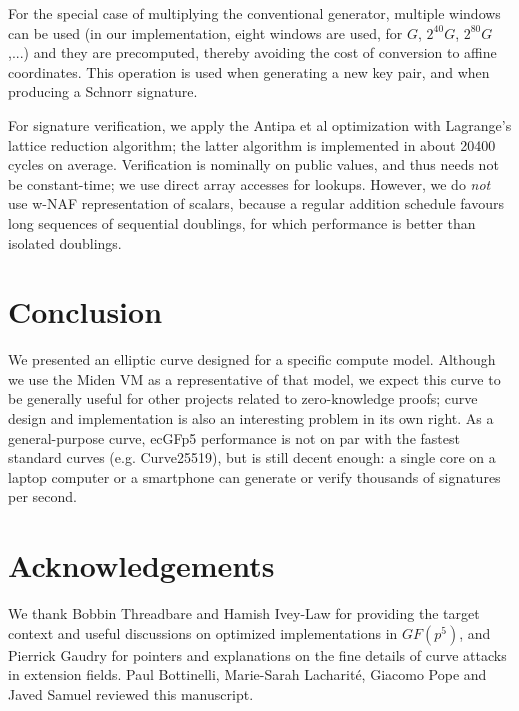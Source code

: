 \documentclass{llncs}
\newcommand{\GF}{GF}
\begin{document}
For the special case of multiplying the conventional generator, multiple
windows can be used (in our implementation, eight windows are used, for
$G$, $2^{40} G$, $2^{80} G$,...) and they are precomputed, thereby
avoiding the cost of conversion to affine coordinates. This operation is
used when generating a new key pair, and when producing a Schnorr
signature.

For signature verification, we apply the Antipa et al
optimization\cite{AntBroGalLamStrVan2005} with Lagrange's lattice
reduction algorithm\cite{Por2020-2}; the latter algorithm is implemented
in about 20400 cycles on average. Verification is nominally on public
values, and thus needs not be constant-time; we use direct array
accesses for lookups. However, we do \emph{not} use w-NAF representation
of scalars, because a regular addition schedule favours long sequences
of sequential doublings, for which performance is better than isolated
doublings.

\section{Conclusion}

We presented an elliptic curve designed for a specific compute model.
Although we use the Miden VM as a representative of that model, we
expect this curve to be generally useful for other projects related to
zero-knowledge proofs; curve design and implementation is also an
interesting problem in its own right. As a general-purpose curve, ecGFp5
performance is not on par with the fastest standard curves (e.g.
Curve25519), but is still decent enough: a single core on a laptop
computer or a smartphone can generate or verify thousands of signatures
per second.

\section*{Acknowledgements}

We thank Bobbin Threadbare and Hamish Ivey-Law for providing the target
context and useful discussions on optimized implementations in
$\GF(p^5)$, and Pierrick Gaudry for pointers and explanations on the
fine details of curve attacks in extension fields. Paul Bottinelli,
Marie-Sarah Lacharité, Giacomo Pope and Javed Samuel reviewed this
manuscript.
\end{document}
